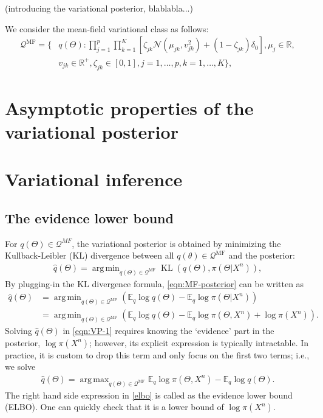 \documentclass[pdftex]{imsart}
\DeclareMathOperator*{\argmin}{arg\,min}
\DeclareMathOperator*{\argmax}{arg\,max}
\DeclareMathOperator*{\KL}{\text{KL}}
\theoremstyle{plain}
\begin{document}
(introducing the variational posterior, blablabla...)


We consider the mean-field variational class as follows:
\begin{equation}
\begin{split}
\label{vbclass}
\mathcal{Q}^{\text{MF}} = 
\Big\{
& q(\Theta): 
\prod_{j=1}^p \prod_{k = 1}^K
\left[
\zeta_{jk} \mathcal{N}(\mu_{jk}, v_{jk}^2) + 
(1 - \zeta_{jk}) \delta_0
\right], \mu_j \in \mathbb{R}, \\
& v_{jk} \in \mathbb{R}^+,
\zeta_{jk} \in [0, 1], j = 1, \dots, p, k = 1, \dots, K
\Big\},
\end{split}
\end{equation}

\section{Asymptotic properties of the variational posterior} 




\section{Variational inference}


\subsection{The evidence lower bound}

For $q(\Theta) \in \mathcal{Q}^{MF}$, the variational posterior is obtained by minimizing the Kullback-Leibler (KL) divergence between all $q(\theta) \in \mathcal{Q}^{\text{MF}}$ and the posterior:
\begin{align}
\label{eqn:MF-posterior}
    \hat q(\Theta) = \argmin_{q(\Theta) \in \mathcal{Q}^{\text{MF}}}
    \KL\left(q(\Theta), \pi(\Theta|X^n)\right),
\end{align}
By plugging-in the KL divergence formula, 
\eqref{eqn:MF-posterior} can be written as 
\begin{align}
    \hat q(\Theta) 
    & = 
    \argmin_{q(\Theta) \in \mathcal{Q}^{\text{MF}}}
    \left(\mathbb{E}_q \log q(\Theta) - \mathbb{E}_q \log\pi(\Theta|X^n)\right) \nonumber \\
    & =
    \argmin_{q(\Theta) \in \mathcal{Q}^{\text{MF}}}
    \left(
        \mathbb{E}_q \log q(\Theta) - \mathbb{E}_q \log\pi(\Theta, X^n)
        + \log \pi(X^n)
    \right).
    \label{eqn:VP-1}
\end{align}
Solving $\hat q(\Theta)$ in \eqref{eqn:VP-1} requires knowing the `evidence' part in the posterior, $\log \pi(X^n)$; however, its explicit expression is typically intractable. In practice, it is custom to drop this term and only focus on the first two terms; i.e., we solve
\begin{align}
\label{elbo}
    \hat q(\Theta) = 
     \argmax_{q(\Theta) \in \mathcal{Q}^{\text{MF}}}
    \mathbb{E}_q \log\pi(\Theta, X^n) - \mathbb{E}_q \log q(\Theta).
\end{align}
The right hand side expression in \eqref{elbo} is called as the evidence lower bound (ELBO). One can quickly check that it is a lower bound of $\log \pi(X^n)$. 
\end{document}
